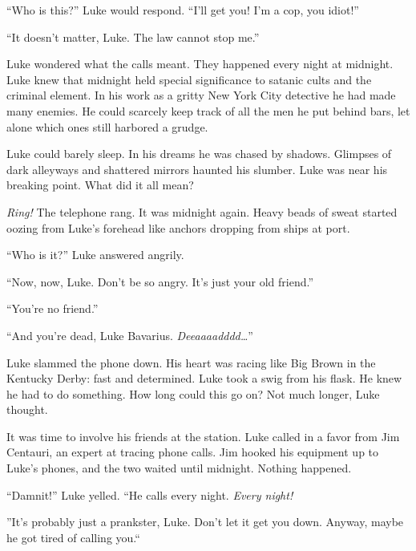 ``Who is this?'' Luke would respond. ``I'll get you! I'm a cop, you
idiot!''



``It doesn't matter, Luke. The law cannot stop me.''



Luke wondered what the calls meant. They happened every night at
midnight. Luke knew that midnight held special significance to
satanic cults and the criminal element. In his work as a gritty New
York City detective he had made many enemies. He could scarcely
keep track of all the men he put behind bars, let alone which ones
still harbored a grudge.



Luke could barely sleep. In his dreams he was chased by shadows.
Glimpses of dark alleyways and shattered mirrors haunted his
slumber. Luke was near his breaking point. What did it all
mean?



{\em Ring!} The telephone rang. It was midnight again. Heavy beads
of sweat started oozing from Luke's forehead like anchors dropping
from ships at port.



``Who is it?'' Luke answered angrily.



``Now, now, Luke. Don't be so angry. It's just your old
friend.''



``You're no friend.''



``And you're dead, Luke Bavarius. {\em Deeaaaadddd{\ldots}}''



Luke slammed the phone down. His heart was racing like Big Brown in
the Kentucky Derby: fast and determined. Luke took a swig from his
flask. He knew he had to do something. How long could this go on?
Not much longer, Luke thought.



It was time to involve his friends at the station. Luke called in a
favor from Jim Centauri, an expert at tracing phone calls. Jim
hooked his equipment up to Luke's phones, and the two waited until
midnight. Nothing happened.



``Damnit!'' Luke yelled. ``He calls every night. {\em Every
night!}



''It's probably just a prankster, Luke. Don't let it get you down.
Anyway, maybe he got tired of calling you.``



